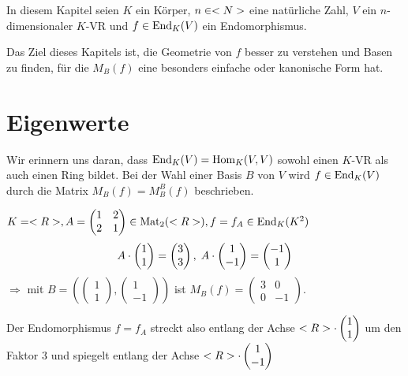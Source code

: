 In diesem Kapitel seien $K$ ein Körper, $n\in<N>$ eine natürliche Zahl, $V$ ein $n$-dimensionaler $K$-VR und $f\in\operatorname{End}_K(V)$ ein Endomorphismus.

Das Ziel dieses Kapitels ist, die Geometrie von $f$ besser zu verstehen und Basen zu finden, für die $M_B(f)$ eine besonders einfache oder kanonische Form hat.

\section{Eigenwerte}

\begin{remark}
	Wir erinnern uns daran, dass $\operatorname{End}_K(V)=\operatorname{Hom}_K(V,V)$ sowohl einen $K$-VR als auch einen Ring bildet. Bei der Wahl einer Basis $B$ von $V$ wird $f\in\operatorname{End}_K(V)$ durch die Matrix $M_B(f)=M_B^B(f)$ beschrieben.	
\end{remark}

\begin{example}
	$K=<R>, A=\begin{pmatrix}1&2\\2&1\end{pmatrix}\in\operatorname{Mat}_2(<R>),f=f_A\in\operatorname{End}_K(K^2)$ \\
	\begin{align}
		A\cdot \begin{pmatrix}1\\1\end{pmatrix}=\begin{pmatrix}3\\3\end{pmatrix},\;A\cdot\begin{pmatrix} 1\\-1\end{pmatrix}=\begin{pmatrix}-1\\1\end{pmatrix}\notag
	\end{align}
	$\Rightarrow$ mit $B=\left( \begin{pmatrix}1\\1\end{pmatrix},\begin{pmatrix}1\\-1\end{pmatrix}\right)$ ist $M_B(f)=\begin{pmatrix}3&0\\0&-1\end{pmatrix}$.
	
	Der Endomorphismus $f=f_A$ streckt also entlang der Achse $<R>\cdot \begin{pmatrix}1\\1\end{pmatrix}$ um den Faktor 3 und spiegelt entlang der Achse $<R>\cdot \begin{pmatrix}1\\-1\end{pmatrix}$
\end{example}

